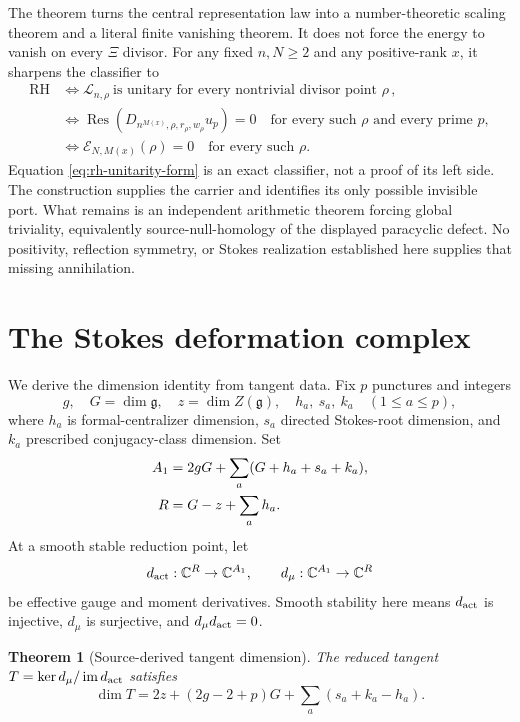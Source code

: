 \documentclass[11pt,a4paper]{amsart}
\theoremstyle{plain}
\newtheorem{theorem}{Theorem}[section]
\theoremstyle{definition}
\newcommand{\CC}{\mathbb C}
\newcommand{\im}{\operatorname{im}}
\begin{document}
The theorem turns the central representation law into a number-theoretic scaling theorem and a
literal finite vanishing theorem.  It does not force the energy to vanish on every $\Xi$ divisor.
For any fixed $n,N\geq2$ and any positive-rank $x$, it sharpens the classifier to
\begin{equation}\label{eq:rh-unitarity-form}
\begin{aligned}
 \mathrm{RH}
 &\Longleftrightarrow
   \mathcal L_{n,\rho}\ \text{is unitary for every nontrivial divisor point }\rho\,,\\
 &\Longleftrightarrow
   \operatorname{Res}(D_{n^{M(x)},\rho,r_\rho,w_\rho}u_p)=0
   \quad\text{for every such }\rho\text{ and every prime }p,\\
 &\Longleftrightarrow
   \mathcal E_{N,M(x)}(\rho)=0
   \quad\text{for every such }\rho.
\end{aligned}
\end{equation}
Equation \eqref{eq:rh-unitarity-form} is an exact classifier, not a proof of its left side.
The construction supplies the carrier and identifies its only possible invisible port.  What
remains is an independent arithmetic theorem forcing global triviality, equivalently
source-null-homology of the displayed paracyclic defect.  No positivity, reflection symmetry,
or Stokes realization established here supplies that missing annihilation.

\section{The Stokes deformation complex}\label{sec:deformation}

We derive the dimension identity from tangent data.  Fix $p$ punctures and integers
\[
 g,\quad G=\dim\mathfrak g,\quad z=\dim Z(\mathfrak g),\quad
 h_a,\ s_a,\ k_a\quad(1\leq a\leq p),
\]
where $h_a$ is formal-centralizer dimension, $s_a$ directed Stokes-root dimension, and $k_a$
prescribed conjugacy-class dimension.  Set
\begin{align}\label{eq:factor-counts}
 A_1&=2gG+\sum_a(G+h_a+s_a+k_a),\\
 R&=G-z+\sum_ah_a.\notag
\end{align}
At a smooth stable reduction point, let
\[
 d_{\rm act}:\CC^R\to\CC^{A_1},\qquad d_\mu:\CC^{A_1}\to\CC^R
\]
be effective gauge and moment derivatives.  Smooth stability here means $d_{\rm act}$ is
injective, $d_\mu$ is surjective, and $d_\mu d_{\rm act}=0$.

\begin{theorem}[Source-derived tangent dimension]\label{thm:tangent}
The reduced tangent $T=\ker d_\mu/\im d_{\rm act}$ satisfies
\begin{equation}\label{eq:tangent}
 \boxed{\dim T=2z+(2g-2+p)G+\sum_a(s_a+k_a-h_a).}
\end{equation}
\end{theorem}
\end{document}
